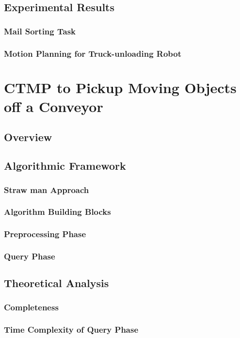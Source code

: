 \documentclass[a4paper,10pt]{article}
\begin{document}
\subsection{Experimental Results}
\subsubsection{Mail Sorting Task}
\subsubsection{Motion Planning for Truck-unloading Robot}

\section{CTMP to Pickup Moving Objects off a Conveyor}
\subsection{Overview}
\subsection{Algorithmic Framework}
\subsubsection{Straw man Approach}
\subsubsection{Algorithm Building Blocks}
\subsubsection{Preprocessing Phase}
\subsubsection{Query Phase}
\subsection{Theoretical Analysis}
\subsubsection{Completeness}
\subsubsection{Time Complexity of Query Phase}
\end{document}
